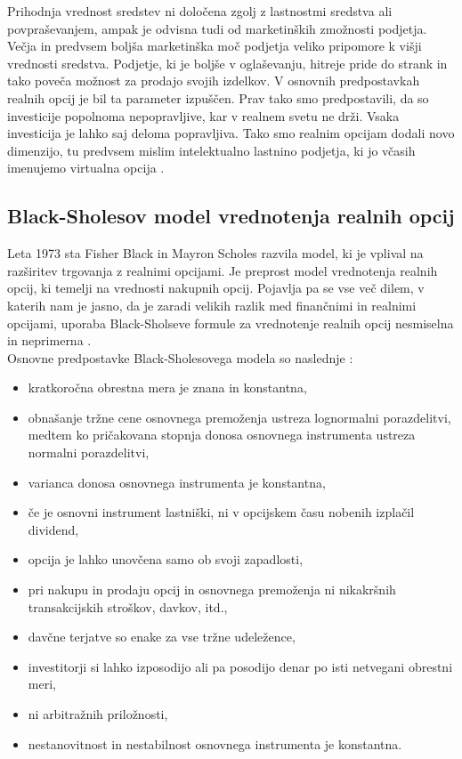 Prihodnja vrednost sredstev ni določena zgolj z lastnostmi sredstva ali povpraševanjem, ampak je odvisna tudi od marketinških zmožnosti podjetja. Večja in predvsem boljša marketinška moč podjetja veliko pripomore k višji vrednosti sredstva. Podjetje, ki je boljše v oglaševanju, hitreje pride do strank in tako poveča možnost za prodajo svojih izdelkov. V osnovnih predpostavkah realnih opcij je bil ta parameter izpuščen. Prav tako smo predpostavili, da so investicije popolnoma nepopravljive, kar v realnem svetu ne drži. Vsaka investicija je lahko saj deloma popravljiva. Tako smo realnim opcijam dodali novo dimenzijo, tu predvsem mislim intelektualno lastnino podjetja, ki jo včasih imenujemo virtualna opcija \cite[str. 43]{Brach}.  \\

\subsection{Black-Sholesov model vrednotenja realnih opcij}
Leta 1973 sta Fisher Black in Mayron Scholes razvila model, ki je vplival na razširitev trgovanja z realnimi opcijami. Je preprost model vrednotenja realnih opcij, ki temelji na vrednosti nakupnih opcij. Pojavlja pa se vse več dilem, v katerih nam je jasno, da je zaradi velikih razlik med finančnimi in realnimi opcijami, uporaba Black-Sholseve formule za vrednotenje realnih opcij nesmiselna in neprimerna \cite[str. 48]{Brach}. \\

Osnovne predpostavke Black-Sholesovega modela so naslednje \cite[str. 19]{Mohar}:
\begin{itemize}
\item kratkoročna obrestna mera je znana in konstantna,
\item obnašanje tržne cene osnovnega premoženja ustreza lognormalni porazdelitvi, medtem ko pričakovana stopnja donosa osnovnega instrumenta ustreza normalni porazdelitvi,
\item varianca donosa osnovnega instrumenta je konstantna,
\item če je osnovni instrument lastniški, ni v opcijskem času nobenih izplačil dividend,
\item opcija je lahko unovčena samo ob svoji zapadlosti,
\item pri nakupu in prodaju opcij in osnovnega premoženja ni nikakršnih transakcijskih stroškov, davkov, itd.,
\item davčne terjatve so enake za vse tržne udeležence,
\item investitorji si lahko izposodijo ali pa posodijo denar po isti netvegani obrestni meri,
\item ni arbitražnih priložnosti,
\item nestanovitnost in nestabilnost osnovnega instrumenta je konstantna.
\end{itemize}

